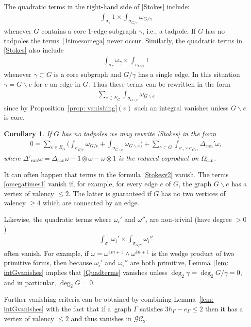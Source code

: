 \documentclass[pdftex]{sigma}%
\newtheorem{cor}[thm]{Corollary}
\numberwithin{equation}{section}
\newcommand{\GC}{\mathcal{GC}}
\newcommand{\can}{\mathrm{can}}
\newcommand{\0}{\color{blue}{\mathsf{0}}}
\begin{document}
The quadratic terms in the right-hand side of \eqref{Stokes} include:
\begin{gather} \label{1timesomega}
\int_{\sigma_{\gamma}} 1 \times \int_{\sigma_{G/\gamma}} \omega_{G/\gamma}
\end{gather}
whenever $G$ contains a core 1-edge subgraph $\gamma$, i.e., a tadpole. If $G$ has no tadpoles the terms~\eqref{1timesomega} never occur. Similarly, the quadratic terms in \eqref{Stokes} also include
\begin{gather} \label{omegatimes1}
\int_{\sigma_{\gamma}} \omega_{\gamma} \times \int_{\sigma_{G/\gamma}} 1
\end{gather}
whenever $\gamma\subset G$ is a core subgraph and $G/\gamma$ has a single edge. In this situation $\gamma = G \backslash e$ for $e$ an edge in $G$. Thus these terms can be rewritten in the form
\begin{gather*}
 \sum_{e\in E_G} \int_{\sigma_{G\backslash e}} \omega_{G\backslash e}
 \end{gather*}
since by Proposition~\ref{prop: vanishing}$(v)$ such an integral vanishes unless $G\backslash e$ is core.

\begin{cor}
If $G$ has no tadpoles we may rewrite \eqref{Stokes} in the form
\begin{gather} \label{Stokesv2} 0 = \sum_{e\in E_G} \bigg(\int_{\sigma_{G/e}} \omega_{G/e} + \int_{\sigma_{G\backslash e}} \omega_{G\backslash e} \bigg) + \sum_{\gamma \subset G} \int_{\sigma_{\gamma} \times \sigma_{G/\gamma}} \Delta_{\can}' \omega,\end{gather}
where $\Delta'_{\can} \omega= \Delta_{\can} \omega - 1\otimes \omega - \omega \otimes 1$ is the reduced coproduct on $\Omega_{\can}$.
\end{cor}
 \begin{rem} \label{rem: Termsvanish} It can often happen that terms in the formula \eqref{Stokesv2} vanish.
 The terms \eqref{omegatimes1} vanish if, for example, for every edge $e$ of $G$, the graph $G\backslash e$ has a vertex of valency $\leq 2$. The latter is guaranteed if $G$ has no two vertices of valency $\geq 4$ which are connected by an edge.

Likewise, the quadratic terms where $\omega_i'$ and $\omega''_i$ are non-trivial (have degree $>0$)
\begin{gather} \label{Quadterms} \int_{\sigma_{\gamma}} \omega_i' \times \int_{\sigma_{G/\gamma}} \omega_i''
\end{gather}
 often vanish. For example, if $\omega =\omega^{4m+1} \wedge \omega^{4n+1} $ is the wedge product of two primitive forms,
 then because $\omega_i'$ and $\omega_i''$ are both primitive, Lemma~\ref{lem: intGvanishes} implies that \eqref{Quadterms} vanishes
 unless $\deg_2 \gamma =\deg_2 G/\gamma =0$, and in particular, $\deg_2 G = 0$.

Further vanishing criteria can be obtained by combining Lemma~\ref{lem: intGvanishes} with the fact that if a~graph $\Gamma$ satisfies $3h_{\Gamma} -e_{\Gamma} \leq 2$ then it has a vertex of valency $\leq 2$ and thus vanishes in $\GC_2$.
 \end{rem}
\end{document}
